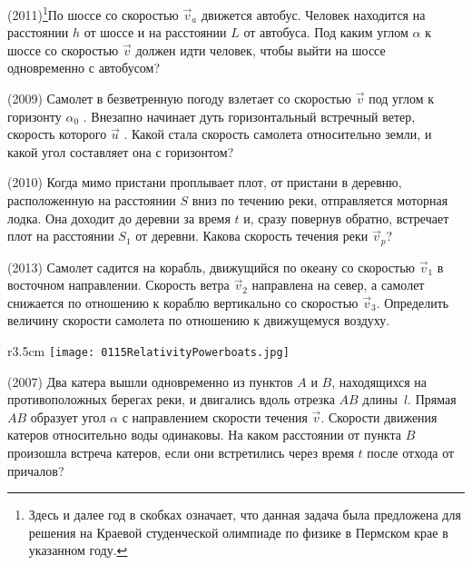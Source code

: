 \AddProb (2011)\footnote{Здесь и далее год в скобках означает, что данная задача была предложена для решения на Краевой студенческой олимпиаде
 по физике в Пермском крае в указанном году.}По шоссе со скоростью $\vec{v}_a$ движется автобус. Человек находится на расстоянии $h$ от шоссе и на расстоянии $L$ от автобуса. 
Под каким углом $\alpha$ к шоссе со скоростью $\vec v$  должен идти человек, чтобы выйти на шоссе одновременно с автобусом? 

\AddProb (2009) Самолет в безветренную погоду взлетает со скоростью $\vec v$  под углом к горизонту $\alpha_0$ . 
Внезапно начинает дуть горизонтальный встречный ветер, скорость которого $\vec u$ . 
Какой стала скорость самолета относительно земли, и какой угол составляет она с горизонтом? 

\AddProb (2010) Когда мимо пристани проплывает плот, от пристани в деревню, расположенную на расстоянии $S$ вниз по течению реки, 
отправляется моторная лодка. Она доходит до деревни за время $t$ и, сразу повернув обратно, встречает плот на расстоянии $ S_1 $ от деревни. 
Какова скорость течения реки $\vec{v}_p $?

\AddProb (2013) Самолет садится на корабль, движущийся по океану со скоростью $\vec{v}_1$ в восточном направлении. 
Скорость ветра $\vec{v}_2$ направлена на север, а самолет снижается по отношению к кораблю вертикально со скоростью $\vec{v}_3$. 
Определить величину скорости самолета по отношению к движущемуся воздуху.

\begin{wrapfigure}{r}{3.5cm}
\texttt{[image: 0115RelativityPowerboats.jpg]}
\end{wrapfigure}

\AddProb (2007) Два катера вышли одновременно из пунктов $A$ и $B$, находящихся на противоположных берегах реки, и двигались вдоль отрезка $AB$ длины~$l$. 
Прямая $AB$ образует угол $\alpha$ с направлением скорости течения $\vec v$. Скорости движения катеров относительно воды одинаковы. 
На каком расстоянии от пункта $B$ произошла встреча катеров, если они встретились через время $t$ после отхода от причалов?